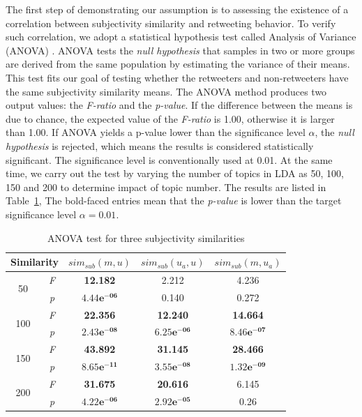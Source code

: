 \documentclass[letterpaper]{article}
\begin{document}
The first step of demonstrating our assumption is to assessing the existence of a correlation between subjectivity similarity and retweeting behavior. 
To verify such correlation, we adopt a statistical hypothesis test called Analysis of Variance (ANOVA) \cite{fisher1970statistical}. 
ANOVA tests the \textit{null hypothesis} that samples in two or more groups are derived from the same population by estimating the variance of their means. 
This test fits our goal of testing whether the retweeters and non-retweeters have the same subjectivity similarity means. 
The ANOVA method produces two output values: the \textit{F-ratio} and the \textit{p-value}. 
If the difference between the means is due to chance, the expected value of the \textit{F-ratio} is 1.00, otherwise it is larger than 1.00. 
If ANOVA yields a p-value lower than the significance level $ \alpha $, the \textit{null hypothesis} is rejected, which means the results is considered statistically significant. 
The significance level is conventionally used at 0.01.
At the same time, we carry out the test by varying the number of topics in LDA as 50, 100, 150 and 200 to determine impact of topic number. 
The results are listed in Table~\ref{tab2}, The bold-faced entries mean that the \textit{p-value} is lower than the target significance level $ \alpha = 0.01 $.
\begin{table}[h]
\scriptsize
\centering
\caption{ANOVA test for three subjectivity similarities}
\label{tab2}
\begin{tabular}{|c|c|c|c|c|}
\hline
\multicolumn{2}{|c|}{Similarity}& $ sim_{sub} \left( m,u \right) $ & $ sim_{sub}\left( u_{a},u \right)  $ & $ sim_{sub}\left( m,u_{a} \right)  $\\
\hline
\multirow{2}{*}{50} & \textit{F} & \textbf{12.182} & 2.212 & 4.236 \\
\cline{2-5}
  & \textit{p} &  $\mathbf{4.44e^{-06}}$  & 0.140 & 0.272\\
\hline
\multirow{2}{*}{100} & \textit{F} & \textbf{22.356} & \textbf{12.240} & \textbf{14.664} \\
\cline{2-5}
  & \textit{p} &  $\mathbf{2.43e^{-08}}$  & $\mathbf{6.25e^{-06}}$ & $\mathbf{8.46e^{-07}}$\\
\hline
\multirow{2}{*}{150} & \textit{F} & \textbf{43.892} & \textbf{31.145} & \textbf{28.466} \\
\cline{2-5}
  & \textit{p} &  $\mathbf{8.65e^{-11}}$  & $\mathbf{3.55e^{-08}}$ & $\mathbf{1.32e^{-09}}$\\
\hline
\multirow{2}{*}{200} & \textit{F} & \textbf{31.675} & \textbf{20.616} & 6.145\\
\cline{2-5}
  & \textit{p} &  $\mathbf{4.22e^{-06}}$  & $\mathbf{2.92e^{-05}}$ & 0.26\\
\hline
\end{tabular}
\end{table}
\end{document}
